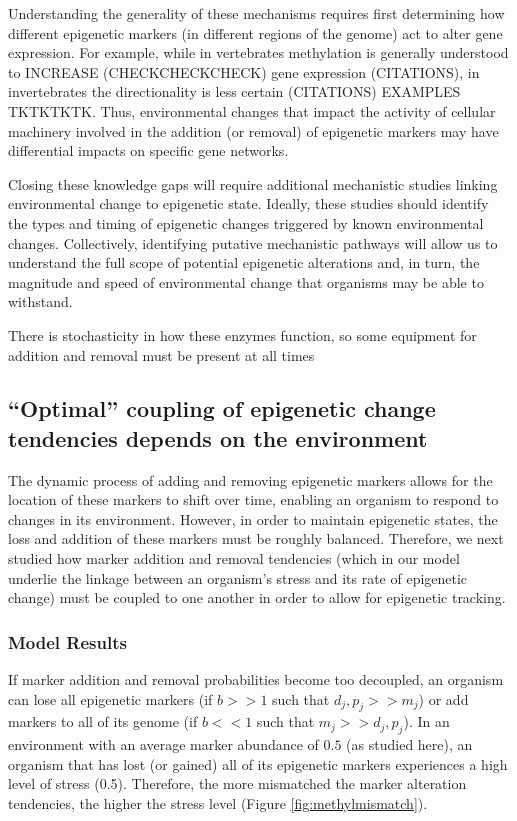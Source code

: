 \documentclass{article}
\begin{document}
Understanding the generality of these mechanisms requires first determining how different epigenetic markers (in different regions of the genome) act to alter gene expression. For example, while in vertebrates methylation is generally understood to INCREASE (CHECKCHECKCHECK) gene expression (CITATIONS), in invertebrates the directionality is less certain (CITATIONS) EXAMPLES TKTKTKTK. Thus, environmental changes that impact the activity of cellular machinery involved in the addition (or removal) of epigenetic markers may have differential impacts on specific gene networks.

Closing these knowledge gaps will require additional mechanistic studies linking environmental change to epigenetic state. Ideally, these studies should identify the types and timing of epigenetic changes triggered by known environmental changes. Collectively, identifying putative mechanistic pathways will allow us to understand the full scope of potential epigenetic alterations and, in turn, the magnitude and speed of environmental change that organisms may be able to withstand.

There is stochasticity in how these enzymes function, so some equipment for addition and removal must be present at all times

\clearpage

\subsection{``Optimal'' coupling of epigenetic change tendencies depends on the environment}

The dynamic process of adding and removing epigenetic markers allows for the location of these markers to shift over time, enabling an organism to respond to changes in its environment. However, in order to maintain epigenetic states, the loss and addition of these markers must be roughly balanced. Therefore, we next studied how marker addition and removal tendencies (which in our model underlie the linkage between an organism's stress and its rate of epigenetic change) must be coupled to one another in order to allow for epigenetic tracking.


\subsubsection{Model Results}

If marker addition and removal probabilities become too decoupled, an organism can lose all epigenetic markers (if $b >> 1$ such that $d_j, p_j >> m_j$) or add markers to all of its genome (if $b<<1$ such that $m_j >> d_j,p_j$). In an environment with an average marker abundance of $0.5$ (as studied here), an organism that has lost (or gained) all of its epigenetic markers experiences a high level of stress (0.5). Therefore, the more mismatched the marker alteration tendencies, the higher the stress level (Figure \ref{fig:methylmismatch}).
\end{document}
